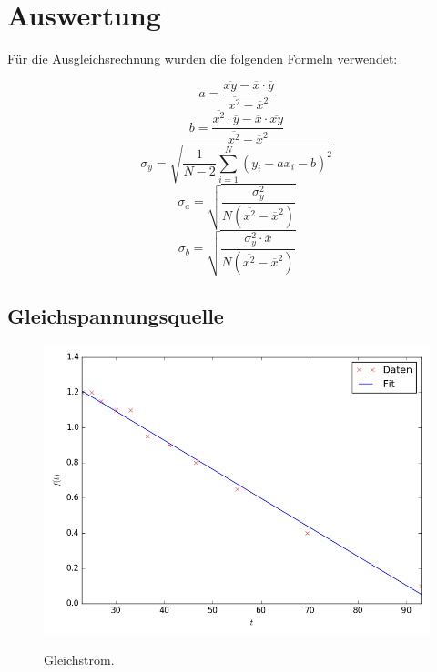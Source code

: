 \section{Auswertung}
\label{sec:Auswertung}
Für die Ausgleichsrechnung wurden die folgenden Formeln verwendet:

\begin{equation}
	a=\frac{ \overline{xy} - \overline{x} \cdot \overline{y}}{\overline{x^2} - \overline{x}^2} 
\end{equation}
\begin{equation}
	b=\frac{\overline{x^2} \cdot \overline{y} - \overline{x} \cdot \overline{xy}}{\overline{x^2} - \overline{x}^2}
\end{equation}
\begin{equation}
	\sigma_y=\sqrt{\frac{1}{N-2}\sum\limits_{i=1}^{N}(y_i - a x_i - b)^2}
\end{equation}
\begin{equation}
	\sigma_a=\sqrt{\frac{\sigma_y^2}{N ( \overline{x^2} - \overline{x} ^2 )}}
\end{equation}
\begin{equation}
	\sigma_b=\sqrt{\frac{\sigma_y^2 \cdot \overline{x}}{N ( \overline{x^2} - \overline{x} ^2 )}}
\end{equation}

\subsection{Gleichspannungsquelle}
\begin{figure}[H]
	\centering
	\caption{Gleichstrom.}
	\includegraphics[width=\linewidth-150pt,height=\textheight-150pt,keepaspectratio]{Gleichstrom.png}
	\label{fig:Gleichstrom}
\end{figure}



